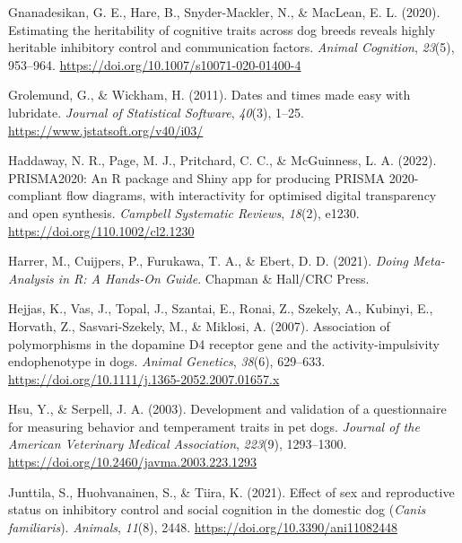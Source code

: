 \documentclass[
  ,pub,floatsintext]{apa6}
\newlength{\cslhangindent}
\newlength{\cslentryspacingunit} %
\newenvironment{CSLReferences}[2] %
 {%
  \setlength{\parindent}{0pt}
  \ifodd #1
  \let\oldpar\par
  \def\par{\hangindent=\cslhangindent\oldpar}
  \fi
  \setlength{\parskip}{#2\cslentryspacingunit}
 }%
 {}
\begin{document}
\begin{CSLReferences}{1}{0}
\leavevmode{}%
Gnanadesikan, G. E., Hare, B., Snyder-Mackler, N., \& MacLean, E. L. (2020). Estimating the heritability of cognitive traits across dog breeds reveals highly heritable inhibitory control and communication factors. \emph{Animal Cognition}, \emph{23}(5), 953--964. \url{https://doi.org/10.1007/s10071-020-01400-4}

\leavevmode{}%
Grolemund, G., \& Wickham, H. (2011). Dates and times made easy with {lubridate}. \emph{Journal of Statistical Software}, \emph{40}(3), 1--25. \url{https://www.jstatsoft.org/v40/i03/}

\leavevmode{}%
Haddaway, N. R., Page, M. J., Pritchard, C. C., \& McGuinness, L. A. (2022). PRISMA2020: An {R} package and {Shiny} app for producing PRISMA 2020-compliant flow diagrams, with interactivity for optimised digital transparency and open synthesis. \emph{Campbell Systematic Reviews}, \emph{18}(2), e1230. \url{https://doi.org/110.1002/cl2.1230}

\leavevmode{}%
Harrer, M., Cuijpers, P., Furukawa, T. A., \& Ebert, D. D. (2021). \emph{Doing {Meta-Analysis} in {R}: {A Hands-On Guide}}. {Chapman \& Hall/CRC Press}.

\leavevmode{}%
Hejjas, K., Vas, J., Topal, J., Szantai, E., Ronai, Z., Szekely, A., Kubinyi, E., Horvath, Z., Sasvari-Szekely, M., \& Miklosi, A. (2007). Association of polymorphisms in the dopamine {D4} receptor gene and the activity-impulsivity endophenotype in dogs. \emph{Animal Genetics}, \emph{38}(6), 629--633. \url{https://doi.org/10.1111/j.1365-2052.2007.01657.x}

\leavevmode{}%
Hsu, Y., \& Serpell, J. A. (2003). Development and validation of a questionnaire for measuring behavior and temperament traits in pet dogs. \emph{Journal of the American Veterinary Medical Association}, \emph{223}(9), 1293--1300. \url{https://doi.org/10.2460/javma.2003.223.1293}

\leavevmode{}%
Junttila, S., Huohvanainen, S., \& Tiira, K. (2021). Effect of sex and reproductive status on inhibitory control and social cognition in the domestic dog ({\emph{Canis}}{ \emph{familiaris}}). \emph{Animals}, \emph{11}(8), 2448. \url{https://doi.org/10.3390/ani11082448}


\end{CSLReferences}
\end{document}
